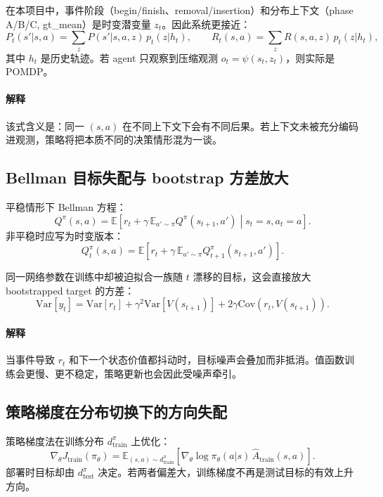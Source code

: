 ﻿\documentclass[11pt,a4paper]{ctexart}
\begin{document}
在本项目中，事件阶段（begin/finish、removal/insertion）和分布上下文（phase A/B/C, gt\_mean）是时变潜变量 $z_t$。因此系统更接近：
\begin{equation}
P_t(s'|s,a)=\sum_z P(s'|s,a,z)\,p_t(z|h_t),\qquad
R_t(s,a)=\sum_z R(s,a,z)\,p_t(z|h_t),
\end{equation}
其中 $h_t$ 是历史轨迹。若 agent 只观察到压缩观测 $o_t=\psi(s_t,z_t)$，则实际是 POMDP。

\paragraph{解释}
该式含义是：同一 $(s,a)$ 在不同上下文下会有不同后果。若上下文未被充分编码进观测，策略将把本质不同的决策情形混为一谈。

\subsection{Bellman 目标失配与 bootstrap 方差放大}
平稳情形下 Bellman 方程：
\begin{equation}
Q^{\pi}(s,a)=\mathbb{E}\left[r_t+\gamma\,\mathbb{E}_{a'\sim\pi}Q^{\pi}(s_{t+1},a')\middle|s_t=s,a_t=a\right].
\end{equation}
非平稳时应写为时变版本：
\begin{equation}
Q_t^{\pi}(s,a)=\mathbb{E}\left[r_t+\gamma\,\mathbb{E}_{a'\sim\pi}Q_{t+1}^{\pi}(s_{t+1},a')\right].
\end{equation}

同一网络参数在训练中却被迫拟合一族随 $t$ 漂移的目标，这会直接放大 bootstrapped target 的方差：
\begin{equation}
\mathrm{Var}[y_t]
=\mathrm{Var}[r_t]+
\gamma^2\mathrm{Var}[V(s_{t+1})]
+2\gamma\mathrm{Cov}(r_t,V(s_{t+1})).
\end{equation}

\paragraph{解释}
当事件导致 $r_t$ 和下一个状态价值都抖动时，目标噪声会叠加而非抵消。值函数训练会更慢、更不稳定，策略更新也会因此受噪声牵引。

\subsection{策略梯度在分布切换下的方向失配}
策略梯度法在训练分布 $d^{\pi}_{\text{train}}$ 上优化：
\begin{equation}
\nabla_\theta J_{\text{train}}(\pi_\theta)
=\mathbb{E}_{(s,a)\sim d^{\pi}_{\text{train}}}
\left[\nabla_\theta\log\pi_\theta(a|s)\,\hat A_{\text{train}}(s,a)\right].
\end{equation}
部署时目标却由 $d^{\pi}_{\text{test}}$ 决定。若两者偏差大，训练梯度不再是测试目标的有效上升方向。
\end{document}
